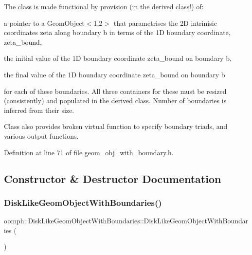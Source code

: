 The class is made functional by provision (in the derived class!) of\+:
\begin{DoxyItemize}
\item a pointer to a Geom\+Object$<$1,2$>$ that parametrises the 2D intrinisic coordinates zeta along boundary b in terms of the 1D boundary coordinate, zeta\+\_\+bound,
\item the initial value of the 1D boundary coordinate zeta\+\_\+bound on boundary b,
\item the final value of the 1D boundary coordinate zeta\+\_\+bound on boundary b
\end{DoxyItemize}for each of these boundaries. All three containers for these must be resized (consistently) and populated in the derived class. Number of boundaries is inferred from their size.

Class also provides broken virtual function to specify boundary triads, and various output functions. 

Definition at line 71 of file geom\+\_\+obj\+\_\+with\+\_\+boundary.\+h.



\subsection{Constructor \& Destructor Documentation}
\mbox{\label{classoomph_1_1DiskLikeGeomObjectWithBoundaries_aa37a5bca3024c20545eeba724c22053c}} 
\subsubsection{\texorpdfstring{Disk\+Like\+Geom\+Object\+With\+Boundaries()}{DiskLikeGeomObjectWithBoundaries()}}
{\footnotesize\ttfamily oomph\+::\+Disk\+Like\+Geom\+Object\+With\+Boundaries\+::\+Disk\+Like\+Geom\+Object\+With\+Boundaries (\begin{DoxyParamCaption}{ }\end{DoxyParamCaption})\hspace{0.3cm}{\ttfamily [inline]}}



